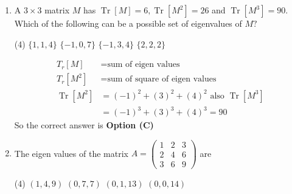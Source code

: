\begin{enumerate}[label=\color{ocre}\textbf{\arabic*.}]
\begin{answer}
\begin{align*}
	M&=\left[\begin{array}{lll}1 & 1 & 1 \\ 1 & 1 & 1 \\ 1 & 1 & 1\end{array}\right] \Rightarrow M^{2} =\left[\begin{array}{lll}3 & 3 & 3 \\ 3 & 3 & 3 \\ 3 & 3 & 3\end{array}\right]=3 M\\
	\text{similarly}\quad M^{3}&=9 M=3^{2} M
	\intertext{we can rewrite $e^M$ as,}
	e^{M}&=I+M+\frac{3 M}{2 !}+\frac{3^{2} M}{3 !}+\frac{3^{3} M}{4 !}+\cdots\\
	&=I+\frac{M}{3}\left[3+\frac{3^{2}}{2 !}+\frac{3^{3}}{3 !}+\frac{3^{4}}{4 !}+\cdots\right]\\
	&=I+\frac{M}{3}\left[e^{3}-1\right]
		\end{align*}
	\end{answer}
	\item A $3 \times 3$ matrix $M$ has $\operatorname{Tr}[M]=6, \operatorname{Tr}\left[M^{2}\right]=26$ and $\operatorname{Tr}\left[M^{3}\right]=90$. Which of the following can be a possible set of eigenvalues of $M ?$
	{}
\begin{tasks}(4)
\task[\textbf{A.}] $\{1,1,4\}$
\task[\textbf{B.}] $\{-1,0,7\}$
\task[\textbf{C.}] $\{-1,3,4\}$
\task[\textbf{D.}] $\{2,2,2\}$
\end{tasks}
\begin{answer}
\begin{align*}
T_r[M]&=\text{sum of eigen values}\\
T_r[M^2]&=\text{sum of square of eigen values}\\
\operatorname{Tr}\left[M^{2}\right]&=(-1)^{2}+(3)^{2}+(4)^{2}\text{ also } \operatorname{Tr}\left[M^{3}\right]\\&=(-1)^{3}+(3)^{3}+(4)^{3}=90
\end{align*}
So the correct answer is \textbf{Option (C)}
\end{answer}
\item The eigen values of the matrix $A=\left(\begin{array}{lll}1 & 2 & 3 \\ 2 & 4 & 6 \\ 3 & 6 & 9\end{array}\right)$ are
{}
\begin{tasks}(4)
	\task[\textbf{A.}] $(1,4,9)$
	\task[\textbf{B.}] $(0,7,7)$
	\task[\textbf{C.}] $(0,1,13)$
	\task[\textbf{D.}] $(0,0,14)$
\end{tasks}
\begin{answer}
	 

\end{answer}
\end{enumerate}
